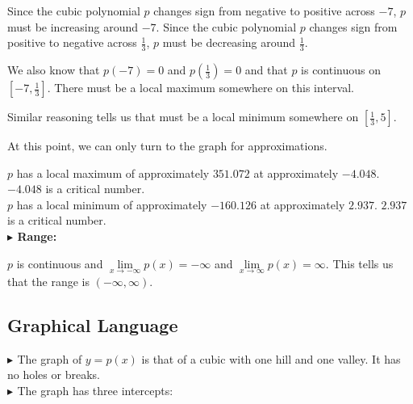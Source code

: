 \documentclass{ximera}
\begin{document}
\begin{exercise}
Since the cubic polynomial $p$ changes sign from negative to positive across $-7$, $p$ must be increasing around $-7$. Since the cubic polynomial $p$ changes sign from positive to negative across $\frac{1}{3}$, $p$ must be decreasing around $\frac{1}{3}$. 


We also know that $p(-7) = 0$ and $p\left( \frac{1}{3} \right) = 0$ and that $p$ is continuous on $\left[-7, \frac{1}{3}  \right]$.  There must be a local maximum somewhere on this interval.


Similar reasoning tells us that must be a local minimum somewhere on $\left[ \frac{1}{3}, 5 \right]$.





At this point, we can only turn to the graph for approximations.



$p$ has a local maximum of approximately $351.072$ at approximately $-4.048$.  $-4.048$ is a critical number. \\





$p$ has a local minimum of approximately $-160.126$ at approximately $2.937$.  $2.937$ is a critical number. \\









\textbf{\textcolor{blue!55!black}{$\blacktriangleright$ Range: }}


$p$ is continuous and  $\lim\limits_{x \to -\infty} p(x) = -\infty$  and $\lim\limits_{x \to \infty} p(x) = \infty$.  This tells us that the range is $(-\infty, \infty)$.








\subsection*{Graphical Language}







\textbf{\textcolor{blue!55!black}{$\blacktriangleright$ }}  The graph of $y = p(x)$ is that of a cubic with one hill and one valley. It has no holes or breaks. \\

\textbf{\textcolor{blue!55!black}{$\blacktriangleright$ }}  The graph has three intercepts:



\end{exercise}
\end{document}
